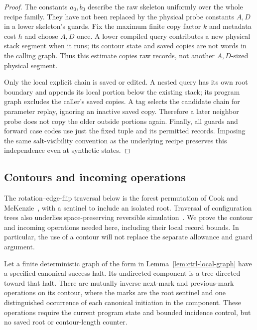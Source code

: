 \begin{proof}
The constants $a_0,b_0$ describe the raw skeleton uniformly over the
whole recipe family.  They have not been replaced by the physical probe
constants $A,D$ in a lower skeleton's guards.  Fix the maximum finite
copy factor $k$ and metadata cost $h$ and choose $A,D$ once.  A lower
compiled query contributes a new physical stack segment when it runs;
its contour state and saved copies are not words in the calling graph.
Thus this estimate copies raw records, not another $A,D$-sized physical
segment.

Only the local explicit chain is saved or edited.  A nested query has
its own root boundary and appends its local portion below the existing
stack; its program graph excludes the caller's saved copies.  A tag
selects the candidate chain for parameter replay, ignoring an inactive
saved copy.  Therefore a later neighbor probe does not copy the older
outside portions again.  Finally, all guards and forward case codes
use just the fixed tuple and its permitted records.  Imposing the same
salt-visibility convention as the underlying recipe preserves this
independence even at synthetic states.
\end{proof}

\subsection{Contours and incoming operations}\label{sec:ctrl-incoming}

The rotation--edge-flip traversal below is the forest permutation
of Cook and McKenzie~\cite[Proposition~1, p.~387]{CookMcKenzie1987},
with a sentinel to include an isolated root. Traversal of configuration
trees also underlies space-preserving reversible simulation~\cite{LMT2000}.
We prove the contour and
incoming operations needed here, including their local record bounds.
In particular, the use of a contour will not replace the separate
allowance and guard argument.

\begin{lemma}\label{lem:ctrl-tour}
Let a finite deterministic graph of the form in
Lemma~\ref{lem:ctrl-local-graph} have a specified canonical success halt.
Its undirected component is a tree directed toward that halt.  There
are mutually inverse next-mark and previous-mark operations on its
contour, where the marks are the root sentinel and one distinguished
occurrence of each canonical initiation in the component.  These
operations require the current program state and bounded incidence
control, but no saved root or contour-length counter.
\end{lemma}


